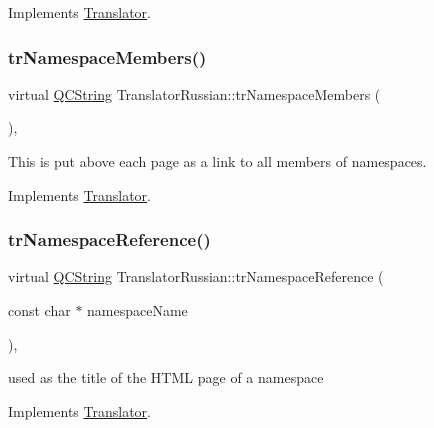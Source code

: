 Implements \mbox{\hyperlink{class_translator}{Translator}}.

\mbox{\label{class_translator_russian_a74b05b9a30ac07655b047adb982c9d21}} 
\subsubsection{\texorpdfstring{trNamespaceMembers()}{trNamespaceMembers()}}
{\footnotesize\ttfamily virtual \mbox{\hyperlink{class_q_c_string}{Q\+C\+String}} Translator\+Russian\+::tr\+Namespace\+Members (\begin{DoxyParamCaption}{ }\end{DoxyParamCaption})\hspace{0.3cm}{\ttfamily [inline]}, {\ttfamily [virtual]}}

This is put above each page as a link to all members of namespaces. 

Implements \mbox{\hyperlink{class_translator}{Translator}}.

\mbox{\label{class_translator_russian_ac9f9d16800626261282dcfb86eb85d90}} 
\subsubsection{\texorpdfstring{trNamespaceReference()}{trNamespaceReference()}}
{\footnotesize\ttfamily virtual \mbox{\hyperlink{class_q_c_string}{Q\+C\+String}} Translator\+Russian\+::tr\+Namespace\+Reference (\begin{DoxyParamCaption}\item[{const char $\ast$}]{namespace\+Name }\end{DoxyParamCaption})\hspace{0.3cm}{\ttfamily [inline]}, {\ttfamily [virtual]}}

used as the title of the H\+T\+ML page of a namespace 

Implements \mbox{\hyperlink{class_translator}{Translator}}.

\mbox{\label{class_translator_russian_abd0922511b476b390d9bbf532cac0f72}} 
